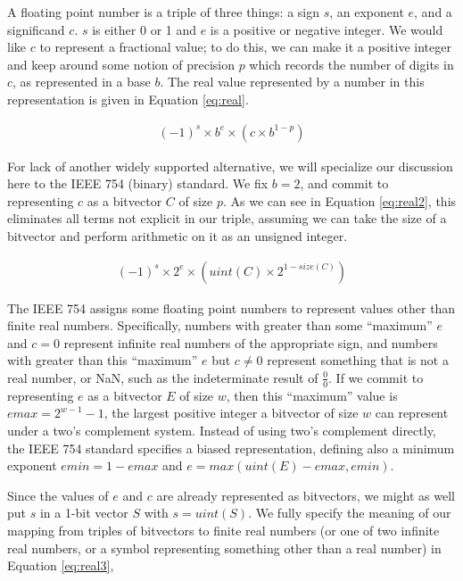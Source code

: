 \documentclass[letterpaper,10pt]{article}
\begin{document}
A floating point number is a triple of three things: a sign $s$, an exponent $e$, and a significand $c$. $s$ is either 0 or 1 and $e$ is a positive or negative integer. We would like $c$ to represent a fractional value; to do this, we can make it a positive integer and keep around some notion of precision $p$ which records the number of digits in $c$, as represented in a base $b$. The real value represented by a number in this representation is given in Equation \ref{eq:real}.

\begin{align} \label{eq:real}
 (-1)^s \times b^e \times (c \times b^{1 - p})
\end{align}

For lack of another widely supported alternative, we will specialize our discussion here to the IEEE 754 (binary) standard. We fix $b = 2$, and commit to representing $c$ as a bitvector $C$ of size $p$. As we can see in Equation \ref{eq:real2}, this eliminates all terms not explicit in our triple, assuming we can take the size of a bitvector and perform arithmetic on it as an unsigned integer.

\begin{align} \label{eq:real2}
 (-1)^s \times 2^e \times (uint(C) \times 2^{1 - size(C)})
\end{align}

The IEEE 754 assigns some floating point numbers to represent values other than finite real numbers. Specifically, numbers with greater than some ``maximum'' $e$ and $c = 0$ represent infinite real numbers of the appropriate sign, and numbers with greater than this ``maximum'' $e$ but $c \neq 0$ represent something that is not a real number, or NaN, such as the indeterminate result of $\frac{0}{0}$. If we commit to representing $e$ as a bitvector $E$ of size $w$, then this ``maximum'' value is $emax = 2^{w-1} - 1$, the largest positive integer a bitvector of size $w$ can represent under a two's complement system. Instead of using two's complement directly, the IEEE 754 standard specifies a biased representation, defining also a minimum exponent $emin = 1 - emax$ and $e = max(uint(E) - emax, emin)$.

Since the values of $e$ and $c$ are already represented as bitvectors, we might as well put $s$ in a 1-bit vector $S$ with $s = uint(S)$. We fully specify the meaning of our mapping from triples of bitvectors to finite real numbers (or one of two infinite real numbers, or a symbol representing something other than a real number) in Equation \ref{eq:real3},
\end{document}
